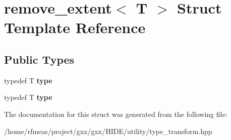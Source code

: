 \hypertarget{structremove__extent}{}\section{remove\+\_\+extent$<$ T $>$ Struct Template Reference}
\label{structremove__extent}
\subsection*{Public Types}
\begin{DoxyCompactItemize}
\item 
typedef T {\bfseries type}\hypertarget{structremove__extent_a6bc6b08db740c4259cd785c14096858d}{}\label{structremove__extent_a6bc6b08db740c4259cd785c14096858d}

\item 
typedef T {\bfseries type}\hypertarget{structremove__extent_a6bc6b08db740c4259cd785c14096858d}{}\label{structremove__extent_a6bc6b08db740c4259cd785c14096858d}

\end{DoxyCompactItemize}


The documentation for this struct was generated from the following file\+:\begin{DoxyCompactItemize}
\item 
/home/rfmeas/project/gxx/gxx/\+H\+I\+D\+E/utility/type\+\_\+transform.\+hpp\end{DoxyCompactItemize}
